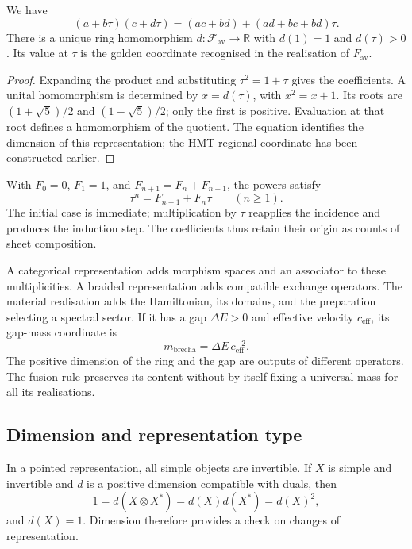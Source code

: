 \begin{proposition}
\label{vi:vi:prop:fusion-av}
We have
\[
 (a+b\tau)(c+d\tau)
 =(ac+bd)+(ad+bc+bd)\tau.
\]
There is a unique ring homomorphism $d:\mathcal F_{\mathrm{av}}
\to\mathbb R$ with $d(1)=1$ and $d(\tau)>0$. Its value at $\tau$
is the golden coordinate recognised in the realisation of $F_{\mathrm{av}}$.
\end{proposition}
\begin{proof}
Expanding the product and substituting $\tau^2=1+\tau$ gives the coefficients.
A unital homomorphism is determined by $x=d(\tau)$, with
$x^2=x+1$. Its roots are $(1+\sqrt5)/2$ and $(1-\sqrt5)/2$;
only the first is positive. Evaluation at that root defines a
homomorphism of the quotient. The equation identifies the dimension of this
representation; the HMT regional coordinate has been constructed earlier.
\end{proof}

With $F_0=0$, $F_1=1$, and $F_{n+1}=F_n+F_{n-1}$, the powers satisfy
\[
 \tau^n=F_{n-1}+F_n\tau\qquad(n\geq1).
\]
The initial case is immediate; multiplication by $\tau$ reapplies
the incidence and produces the induction step. The coefficients thus retain
their origin as counts of sheet composition.

A categorical representation adds morphism spaces and an
associator to these multiplicities. A braided representation adds
compatible exchange operators. The material realisation adds
the Hamiltonian, its domains, and the preparation selecting a
spectral sector. If it has a gap $\Delta E>0$ and effective velocity
$c_{\mathrm{eff}}$, its gap-mass coordinate is
\[
 m_{\mathrm{brecha}}=\Delta E\,c_{\mathrm{eff}}^{-2}.
\]
The positive dimension of the ring and the gap are outputs of different
operators. The fusion rule preserves its content without by
itself fixing a universal mass for all its realisations.

\subsection{Dimension and representation type}

In a pointed representation, all simple objects are
invertible. If $X$ is simple and invertible and $d$ is a positive
dimension compatible with duals, then
\[
 1=d(X\otimes X^*)=d(X)d(X^*)=d(X)^2,
\]
and $d(X)=1$. Dimension therefore provides a check on
changes of representation.

